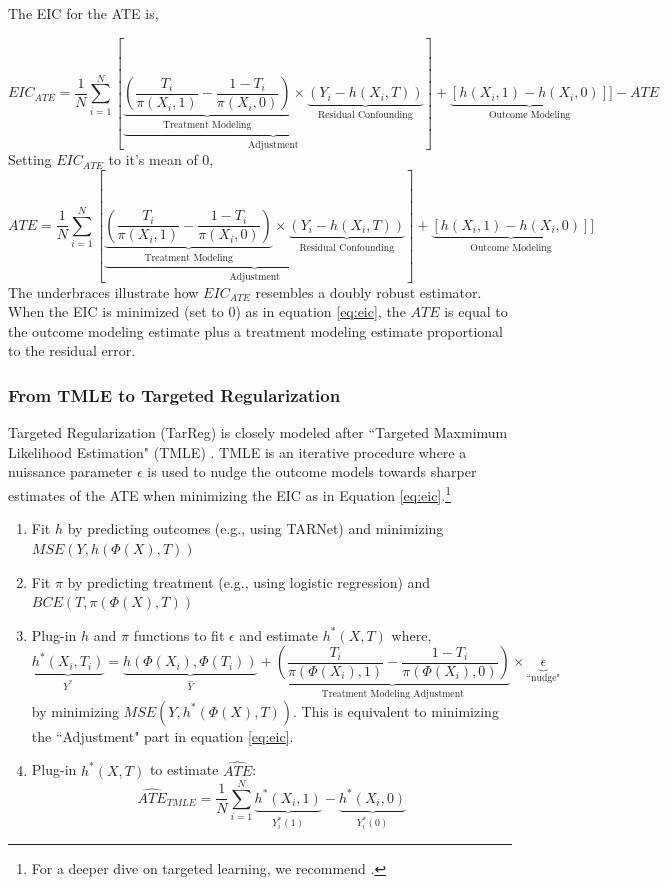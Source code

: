 The EIC for the ATE is,

\begin{equation}
EIC_{ATE} = \frac{1}{N}\sum_{i=1}^N{[\underbrace{\underbrace{(\frac{T_i}{\pi(X_i,1)}-\frac{1-T_i}{\pi(X_i,0)})}_{\text{Treatment Modeling}}\times\underbrace{(Y_i-h(X_i,T))}_{\text{Residual Confounding}}}_{\text{Adjustment}}] +\underbrace{[h(X_i,1)-h(X_i,0)]}_{\text{Outcome Modeling}}}]-ATE
\end{equation}
Setting $EIC_{ATE}$ to it's mean of 0,
\begin{equation}
ATE = \frac{1}{N}\sum_{i=1}^N{[\underbrace{\underbrace{(\frac{T_i}{\pi(X_i,1)}-\frac{1-T_i}{\pi(X_i,0)})}_{\text{Treatment Modeling}}\times\underbrace{(Y_i-h(X_i,T))}_{\text{Residual Confounding}}}_{\text{Adjustment}}] +\underbrace{[h(X_i,1)-h(X_i,0)]}_{\text{Outcome Modeling}}}]
\label{eq:eic}
\end{equation}
The underbraces illustrate how $EIC_{ATE}$ resembles a doubly robust estimator. When the EIC is minimized (set to 0) as in equation \ref{eq:eic}, the $ATE$ is equal to the outcome modeling estimate plus a treatment modeling estimate proportional to the residual error. 

\subsubsection{From TMLE to Targeted Regularization}

Targeted Regularization (TarReg) is closely modeled after ``Targeted Maxmimum Likelihood Estimation" (TMLE) \citep{van2011targeted}. 
TMLE is an iterative procedure where a nuissance parameter $\epsilon$ is used to nudge the outcome models towards sharper estimates of the ATE when minimizing the EIC as in Equation \ref{eq:eic}.\footnote{For a deeper dive on targeted learning, we recommend \citep{chambaz2020}.}

\begin{enumerate}
\singlespacing
\item Fit $h$ by predicting outcomes (e.g., using TARNet) and minimizing $MSE(Y,h(\Phi(X),T))$
\item Fit $\pi$ by predicting treatment (e.g., using logistic regression) and $BCE(T,\pi(\Phi(X),T))$
\item Plug-in $h$ and $\pi$ functions to fit $\epsilon$ and estimate $h^{*}(X,T)$ where,
$$\underbrace{h^{*}(X_i,T_i)}_{Y^*}=\underbrace{h(\Phi(X_i),\Phi(T_i))}_{\hat{Y}}+\underbrace{\left(\frac{T_i}{\pi(\Phi(X_i),1)}-\frac{1-T_i}{\pi(\Phi(X_i),0)}\right)}_{\text{Treatment Modeling Adjustment}}\times \underbrace{\epsilon}_{\text{``nudge"}}$$
by minimizing $MSE(Y,h^{*}(\Phi(X),T))$. This is equivalent to minimizing the ``Adjustment" part in equation \ref{eq:eic}.
\item Plug-in $h^*(X,T)$ to estimate $\hat{ATE}$:
$$\widehat{ATE}_{TMLE}=\frac{1}{N}\sum_{i=1}^N{ \underbrace{h^*(X_i,1)}_{Y_i^*(1)}-\underbrace{ h^*(X_i,0)}_{Y_i^*(0)}}$$
\doublespacing
\end{enumerate}

